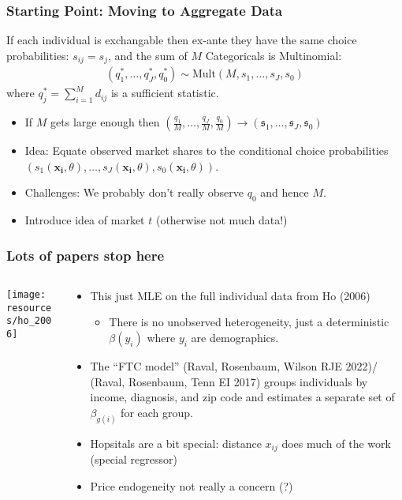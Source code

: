 \begin{frame}
\frametitle{Starting Point: Moving to Aggregate Data}
If each individual is \alert{exchangable} then ex-ante they have the same choice probabilities: $s_{ij}=s_j$, and the sum of $M$ Categoricals is Multinomial:
\begin{align*}
(q_{1}^{*},\ldots,q_{J}^{*},q_{0}^{*}) \sim \text{Mult} (M, s_{1},\ldots,s_{J},s_{0} ) 
\end{align*}
where $q_{j}^{*}=\sum_{i=1}^M d_{ij}$ is a \alert{sufficient statistic}. 
\begin{itemize}
\item If $M$ gets large enough then $(\frac{q_1}{M},\ldots,\frac{q_J}{M},\frac{q_0}{M})\rightarrow (\mathfrak{s}_1,\ldots,\mathfrak{s}_J,\mathfrak{s}_0)$
 \item Idea: Equate observed market shares to the conditional choice probabilities $(s_1(\mathbf{x_i},\theta),\ldots,s_J(\mathbf{x_i},\theta),s_0(\mathbf{x_i},\theta))$.
\item  Challenges: We probably don't really observe $q_0$ and hence $M$.
\item Introduce idea of market $t$ (otherwise not much data!)
\end{itemize}
\end{frame}




\begin{frame}\frametitle{Lots of papers stop here}
\begin{columns}
\begin{column}{0.3\textwidth}
     \texttt{[image: resources/ho\_2006]}      
\end{column}
\begin{column}{0.7\textwidth}
\begin{itemize}
\item This just MLE on the full individual data from Ho (2006)
\begin{itemize}
\item There is no unobserved heterogeneity, just a deterministic $\beta(y_i)$ where $y_i$ are demographics.
\end{itemize}
\item The ``FTC model'' (Raval, Rosenbaum, Wilson RJE 2022)/ (Raval, Rosenbaum, Tenn EI 2017) groups individuals by income, diagnosis, and zip code and estimates a separate set of $\beta_{g(i)}$ for each group.
\item Hopsitals are a bit special: distance $x_{ij}$ does much of the work (special regressor)
\item Price endogeneity not really a concern (?)
\end{itemize}
\end{column}
\end{columns}
\end{frame}

